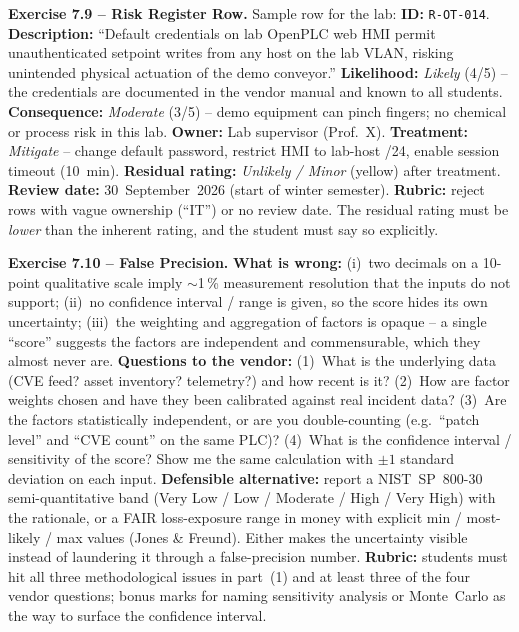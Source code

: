 \documentclass[11pt,a4paper]{article}
\begin{document}
\begin{solutionbox}
\textbf{Exercise 7.9 -- Risk Register Row.}
Sample row for the lab:
\textbf{ID:} \texttt{R-OT-014}.
\textbf{Description:} ``Default credentials on lab OpenPLC web HMI
permit unauthenticated setpoint writes from any host on the lab VLAN,
risking unintended physical actuation of the demo conveyor.''
\textbf{Likelihood:} \emph{Likely} (4/5) -- the credentials are
documented in the vendor manual and known to all students.
\textbf{Consequence:} \emph{Moderate} (3/5) -- demo equipment can pinch
fingers; no chemical or process risk in this lab.
\textbf{Owner:} Lab supervisor (Prof.\ X).
\textbf{Treatment:} \emph{Mitigate} -- change default password,
restrict HMI to lab-host /24, enable session timeout (10~min).
\textbf{Residual rating:} \emph{Unlikely / Minor} (yellow) after
treatment.
\textbf{Review date:} 30~September~2026 (start of winter semester).
\textbf{Rubric:} reject rows with vague ownership (``IT'') or no
review date. The residual rating must be \emph{lower} than the
inherent rating, and the student must say so explicitly.
\end{solutionbox}

\begin{solutionbox}
\textbf{Exercise 7.10 -- False Precision.}
\textbf{What is wrong:} (i)~two decimals on a 10-point qualitative
scale imply $\sim$1\,\% measurement resolution that the inputs do not
support; (ii)~no confidence interval / range is given, so the score
hides its own uncertainty; (iii)~the weighting and aggregation of
factors is opaque -- a single ``score'' suggests the factors are
independent and commensurable, which they almost never are.
\textbf{Questions to the vendor:}
(1)~What is the underlying data (CVE feed? asset inventory? telemetry?)
and how recent is it?
(2)~How are factor weights chosen and have they been calibrated against
real incident data?
(3)~Are the factors statistically independent, or are you
double-counting (e.g.\ ``patch level'' and ``CVE count'' on the same PLC)?
(4)~What is the confidence interval / sensitivity of the score? Show
me the same calculation with $\pm 1$ standard deviation on each input.
\textbf{Defensible alternative:} report a NIST~SP~800-30 semi-quantitative
band (Very Low / Low / Moderate / High / Very High) with the rationale,
or a FAIR loss-exposure range in money with explicit min / most-likely / max
values (Jones \& Freund). Either makes the uncertainty visible
instead of laundering it through a false-precision number.
\textbf{Rubric:} students must hit all three methodological issues in
part~(1) and at least three of the four vendor questions; bonus marks
for naming sensitivity analysis or Monte~Carlo as the way to surface
the confidence interval.
\end{solutionbox}
\end{document}
